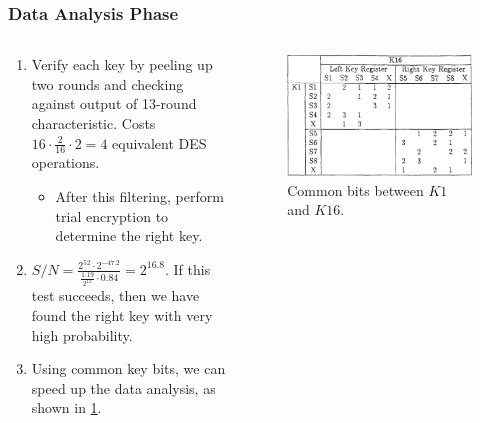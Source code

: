 \documentclass{beamer}
\begin{document}
    \begin{frame}
        \frametitle{Data Analysis Phase}
        \begin{columns}
            \begin{column}{0.6\linewidth}
                \begin{enumerate}
                    \item<1-> Verify each key by peeling up two rounds and
                    checking against output of 13-round characteristic. Costs
                    \(16 \cdot \frac{2}{16} \cdot 2 = 4\) equivalent DES
                    operations.
                    \begin{itemize}
                        \item<2-> After this filtering, perform trial encryption
                        to determine the right key.
                    \end{itemize}
                    \item<3-> \(S/N = \frac{2^{52} \cdot
                    2^{-47.2}}{\frac{1.19}{2^{12}} \cdot 0.84} = 2^{16.8}\). If
                    this test succeeds, then we have found the right key with
                    very high probability.
                    \item<4-> Using common key bits, we can speed up the data
                    analysis, as shown in \cref{fig:des-k1-k16}.
                \end{enumerate}
            \end{column}
            \begin{column}{0.4\linewidth}
                \begin{figure}[!ht]
                    \centering
                    \includegraphics[width=\columnwidth]{images/des-k1-k16.png}
                    \caption{Common bits between \(K1\) and \(K16\).}
                    \label{fig:des-k1-k16}
                \end{figure}
            \end{column}
        \end{columns}
    \end{frame}
\end{document}
